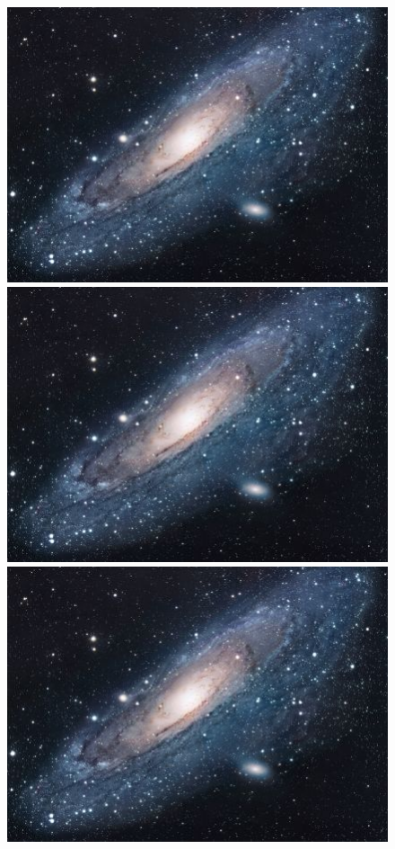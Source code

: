 \begin{figure}[H]
\begin{minipage}{.3\textwidth}
  \centering
  \includegraphics[width=.4\linewidth]{figs/universe}
\end{minipage}%
\begin{minipage}{.3\textwidth}
  \centering
  \includegraphics[width=.4\linewidth]{figs/universe}
\end{minipage}
\begin{minipage}{.3\textwidth}
  \centering
  \includegraphics[width=.4\linewidth]{figs/universe}
\end{minipage}
\end{figure}

